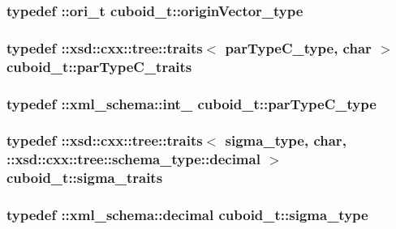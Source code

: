 \hypertarget{classcuboid__t_a20d67505efc00dc82947ce881aec1e76}{
\subsubsection[{origin\-Vector\-\_\-type}]{\setlength{\rightskip}{0pt plus 5cm}typedef \-::{\bf ori\-\_\-t} {\bf cuboid\-\_\-t\-::origin\-Vector\-\_\-type}}}\label{classcuboid__t_a20d67505efc00dc82947ce881aec1e76}
\hypertarget{classcuboid__t_adc1cedef5964dbd3021fa55ee6271554}{
\subsubsection[{par\-Type\-C\-\_\-traits}]{\setlength{\rightskip}{0pt plus 5cm}typedef \-::xsd\-::cxx\-::tree\-::traits$<$ {\bf par\-Type\-C\-\_\-type}, char $>$ {\bf cuboid\-\_\-t\-::par\-Type\-C\-\_\-traits}}}\label{classcuboid__t_adc1cedef5964dbd3021fa55ee6271554}
\hypertarget{classcuboid__t_a162caafd069fa127809bb2d573c752c5}{
\subsubsection[{par\-Type\-C\-\_\-type}]{\setlength{\rightskip}{0pt plus 5cm}typedef \-::{\bf xml\-\_\-schema\-::int\-\_\-} {\bf cuboid\-\_\-t\-::par\-Type\-C\-\_\-type}}}\label{classcuboid__t_a162caafd069fa127809bb2d573c752c5}
\hypertarget{classcuboid__t_a40e03084467dcf27dc74ece86086b047}{
\subsubsection[{sigma\-\_\-traits}]{\setlength{\rightskip}{0pt plus 5cm}typedef \-::xsd\-::cxx\-::tree\-::traits$<$ {\bf sigma\-\_\-type}, char, \-::xsd\-::cxx\-::tree\-::schema\-\_\-type\-::decimal $>$ {\bf cuboid\-\_\-t\-::sigma\-\_\-traits}}}\label{classcuboid__t_a40e03084467dcf27dc74ece86086b047}
\hypertarget{classcuboid__t_ae1de9c7b1d2b2a9098de31c546c0ff83}{
\subsubsection[{sigma\-\_\-type}]{\setlength{\rightskip}{0pt plus 5cm}typedef \-::{\bf xml\-\_\-schema\-::decimal} {\bf cuboid\-\_\-t\-::sigma\-\_\-type}}}\label{classcuboid__t_ae1de9c7b1d2b2a9098de31c546c0ff83}
